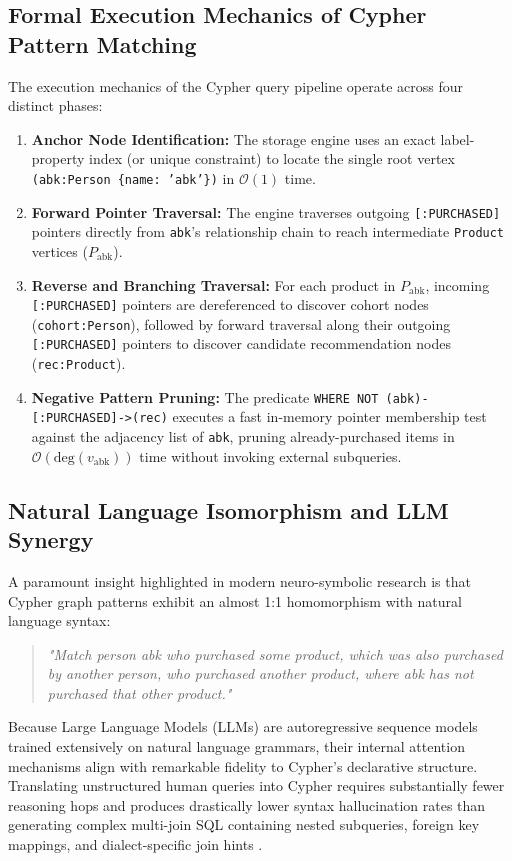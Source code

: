 \documentclass[10pt,twocolumn,letterpaper]{article}
\begin{document}
\subsection{Formal Execution Mechanics of Cypher Pattern Matching}
The execution mechanics of the Cypher query pipeline operate across four distinct phases:
\begin{enumerate}
    \item \textbf{Anchor Node Identification:} The storage engine uses an exact label-property index (or unique constraint) to locate the single root vertex \texttt{(abk:Person \{name: 'abk'\})} in $\mathcal{O}(1)$ time.
    \item \textbf{Forward Pointer Traversal:} The engine traverses outgoing \texttt{[:PURCHASED]} pointers directly from \texttt{abk}'s relationship chain to reach intermediate \texttt{Product} vertices ($P_{\text{abk}}$).
    \item \textbf{Reverse and Branching Traversal:} For each product in $P_{\text{abk}}$, incoming \texttt{[:PURCHASED]} pointers are dereferenced to discover cohort nodes (\texttt{cohort:Person}), followed by forward traversal along their outgoing \texttt{[:PURCHASED]} pointers to discover candidate recommendation nodes (\texttt{rec:Product}).
    \item \textbf{Negative Pattern Pruning:} The predicate \texttt{WHERE NOT (abk)-[:PURCHASED]->(rec)} executes a fast in-memory pointer membership test against the adjacency list of \texttt{abk}, pruning already-purchased items in $\mathcal{O}(\text{deg}(v_{\text{abk}}))$ time without invoking external subqueries.
\end{enumerate}

\subsection{Natural Language Isomorphism and LLM Synergy}
A paramount insight highlighted in modern neuro-symbolic research is that Cypher graph patterns exhibit an almost 1:1 homomorphism with natural language syntax:
\begin{quote}
\textit{"Match person abk who purchased some product, which was also purchased by another person, who purchased another product, where abk has not purchased that other product."}
\end{quote}
Because Large Language Models (LLMs) are autoregressive sequence models trained extensively on natural language grammars, their internal attention mechanisms align with remarkable fidelity to Cypher's declarative structure. Translating unstructured human queries into Cypher requires substantially fewer reasoning hops and produces drastically lower syntax hallucination rates than generating complex multi-join SQL containing nested subqueries, foreign key mappings, and dialect-specific join hints \cite{yu2018spider}.
\end{document}
